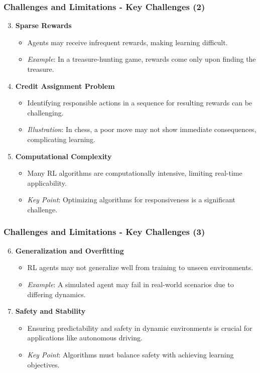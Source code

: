 \documentclass[aspectratio=169]{beamer}
\begin{document}
\begin{frame}[fragile]
  \frametitle{Challenges and Limitations - Key Challenges (2)}
  \begin{enumerate}
    \setcounter{enumi}{2} %
    \item \textbf{Sparse Rewards}
      \begin{itemize}
        \item Agents may receive infrequent rewards, making learning difficult.
        \item \textit{Example}: In a treasure-hunting game, rewards come only upon finding the treasure.
      \end{itemize}

    \item \textbf{Credit Assignment Problem}
      \begin{itemize}
        \item Identifying responsible actions in a sequence for resulting rewards can be challenging.
        \item \textit{Illustration}: In chess, a poor move may not show immediate consequences, complicating learning.
      \end{itemize}
    
    \item \textbf{Computational Complexity}
      \begin{itemize}
        \item Many RL algorithms are computationally intensive, limiting real-time applicability.
        \item \textit{Key Point}: Optimizing algorithms for responsiveness is a significant challenge.
      \end{itemize}
  \end{enumerate}
\end{frame}

\begin{frame}[fragile]
  \frametitle{Challenges and Limitations - Key Challenges (3)}
  \begin{enumerate}
    \setcounter{enumi}{5} %
    \item \textbf{Generalization and Overfitting}
      \begin{itemize}
        \item RL agents may not generalize well from training to unseen environments.
        \item \textit{Example}: A simulated agent may fail in real-world scenarios due to differing dynamics.
      \end{itemize}

    \item \textbf{Safety and Stability}
      \begin{itemize}
        \item Ensuring predictability and safety in dynamic environments is crucial for applications like autonomous driving.
        \item \textit{Key Point}: Algorithms must balance safety with achieving learning objectives.
      \end{itemize}
  \end{enumerate}
\end{frame}
\end{document}
